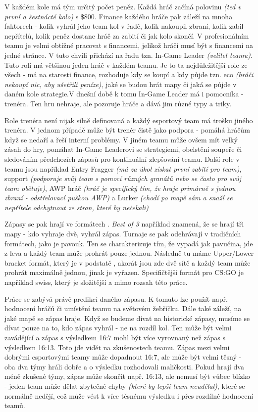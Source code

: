 V každém kole má tým určitý počet peněz. Každá hráč začíná polovinu \textit{(ted v první a šestnácté kolo)} s \$800. Finance každého hráče pak záleží na mnoha faktorech - kolik vyhrál jeho team kol v řadě, kolik nakoupil
zbraní, kolik zabil nepřítelů, kolik peněz dostane hráč za zabití či jak kolo skončí. V profesionálním teamu je velmi obtížné pracovat s financemi, jelikož hráči musí být s financemi na jedné stránce. V tuto chvíli přichází
na řadu tzn. In-Game Leader \textit{(velitel teamu)}. Tuto roli má většinou jeden hráč v každém teamu. Je to ta nejdůležitější role ze všech - má na starosti finance, rozhoduje kdy se koupí a kdy půjde tzn. eco 
\textit{(hráči nekoupí nic, aby ušetřili peníze)}, jaké se budou hrát mapy či jaká se půjde v daném kole strategie.V dnešní době k tomu In-Game Leader má i pomocníka - trenéra. Ten hru nehraje, ale pozoruje hráče a dává jim
různé typy a triky.

Role trenéra není nijak silně definovaná a každý esportový team má trošku jiného trenéra. V jednom případě může být trenér čistě jako podpora - pomáhá hráčům když se nedaří a řeší interní problémy. V jiném
teamu může ovšem mít velký zásah do hry, pomáhat In-Game Leaderovi se strategiemi, obelstění soupeře či sledováním předchozích zápasů pro kontinuální zlepšování teamu.
Další role v teamu jsou například Entry Fragger \textit{(má za úkol získat první zabití pro team)}, support \textit{(podporuje svůj team s pomocí různých granátů nebo se často pro svůj team obětuje)}, AWP hráč
\textit{(hráč je specifický tím, že hraje primárně s jednou zbraní - odstřelovací puškou AWP)} a Lurker \textit{(chodí po mapě sám a snaží se nepřítele odchytnout ze stran, které by nečekali)}

Zápasy se pak hrají ve formátech . \textit{Best of 3} například znamená, že se hrají tři mapy - kdo vyhraje dvě, vyhrál zápas. Turnaje se pak odehrávají v tradičních formátech, jako je pavouk.
Ten se charakterizuje tím, že vypadá jak pavučina, jde z leva a každý team může prohrát pouze jednou. Následně tu máme Upper/Lower bracket formát, který je v podstatě , akorát jsou zde dvě
sítě a každý team může prohrát maximálně jednou, jinak je vyřazen. Specifičtější formát pro \ac{CS:GO} je například swiss, který je složitější a mimo rozsah této práce.

Práce se zabývá právě predikcí daného zápasu. K tomuto lze použít např. hodnocení hráčů či umístění teamu na světovém žebříčku. Dále také záleží, na jaké mapě se zápas hraje. Když se budeme dívat na historické 
zápasy, musíme se dívat pouze na to, kdo zápas vyhrál - ne na rozdíl kol. Ten může být velmi zavádějící a zápas s výsledkem 16:7 mohl být více vyrovnaný než zápas s výsledkem 16:13. Toto jde vidět na zkušenostech teamu.
Zápas mezi velmi dobrými esportovými teamy může dopadnout 16:7, ale může být velmi těsný - oba dva týmy hráli dobře a o výsledku rozhodovali maličkosti. Pokud hrají dva méně zkušené týmy, zápas může skončit např. 16:13,
ale nemusí být vůbec blízko - jeden team může dělat zbytečné chyby \textit{(které by lepší team neudělal)}, které se normálně nedějí, což může vést k více těsnému výsledku i přes rozdílné hodnocení teamů.  